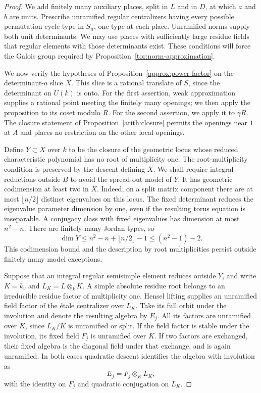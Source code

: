 \begin{proof}
We add finitely many auxiliary places, split in $L$ and in $D$, at
which $a$ and $b$ are units.  Prescribe unramified regular centralizers
having every possible permutation cycle type in $S_n$, one type at
each place.  Unramified norms supply both unit determinants.  We may
use places with sufficiently large residue fields that regular elements
with those determinants exist.  These conditions will force the Galois
group required by Proposition~\ref{tor:norm-approximation}.

We now verify the hypotheses of Proposition~\ref{approx:power-factor}
on the determinant-$a$ slice $X$.  This slice is a rational translate
of $S$, since the determinant on $U(k)$ is onto.  For the first
assertion, weak approximation supplies a rational point meeting the
finitely many openings; we then apply the proposition to its coset
modulo $R$.  For the second assertion, we apply it to $\gamma R$.
The closure statement of Proposition~\ref{arith:closure} permits the
openings near $1$ at $A$ and places no restriction on the other local
openings.

Define $Y\subset X$ over $k$ to be the closure of the geometric locus
whose reduced characteristic polynomial has no root of multiplicity one.
The root-multiplicity condition is preserved by the descent defining
$X$.  We shall require integral reductions outside $B$ to avoid the
spread-out model of $Y$.  It has geometric codimension at least two
in $X$.  Indeed, on a split matrix component there are at most $\lfloor n/2\rfloor$ distinct eigenvalues on this locus.  The
fixed determinant reduces the eigenvalue parameter dimension by one,
even if the resulting torus equation is inseparable.  A conjugacy
class with fixed eigenvalues has dimension at most $n^2-n$.
There are finitely many Jordan types, so
\[
 \dim Y\leq n^2-n+\lfloor n/2\rfloor-1
             \leq (n^2-1)-2.
\]
This codimension bound and the description by root multiplicities
persist outside finitely many model exceptions.

Suppose that an integral regular semisimple element reduces outside
$Y$, and write $K=k_v$ and $L_K=L\otimes_k K$.  A simple absolute
residue root belongs to an irreducible residue factor of multiplicity
one.  Hensel lifting supplies an unramified field factor of the \'etale
centralizer over $L_K$.  Take its full orbit under the involution and
denote the resulting algebra by $E_j$.  All its factors are unramified
over $K$, since $L_K/K$ is unramified or split.  If the field factor is
stable under the involution, its fixed field $F_j$ is unramified over
$K$.  If two factors are exchanged, their fixed algebra is the diagonal
field under that exchange, and is again unramified.  In both cases
quadratic descent identifies the algebra with involution as
\[
 E_j=F_j\otimes_K L_K,
\]
with the identity on $F_j$ and quadratic conjugation on $L_K$.


\end{proof}
